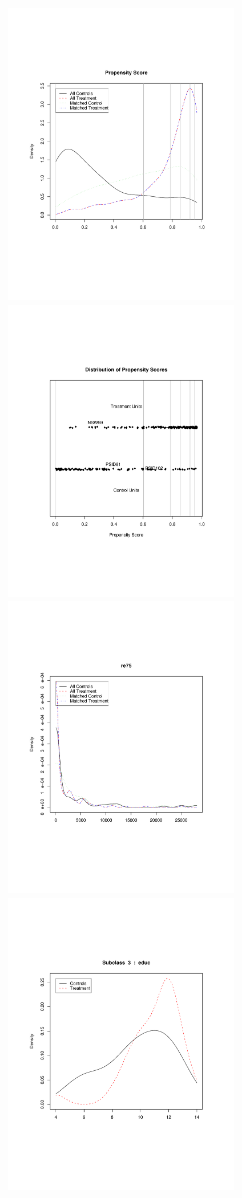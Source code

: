 \documentclass[oneside,letterpaper,titlepage]{article}
\begin{document}
\begin{figure}[tbp]
  \begin{center}
    \includegraphics[width=2.35in,angle=0]{figs/pscore}
    \includegraphics[width=2.35in,angle=0]{figs/pjitter}
    \includegraphics[width=2.35in,angle=0]{figs/re75dens}
    \includegraphics[width=2.35in,angle=0]{figs/sub3educ}

\end{center}
\end{figure}
\end{document}
